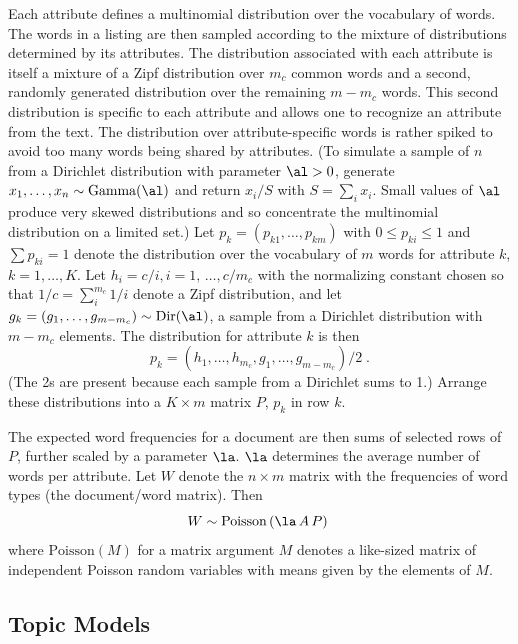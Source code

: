 \documentclass[10pt]{article}
\begin{document}
Each attribute defines a multinomial distribution over the vocabulary of words. The words in a listing are then sampled according to the mixture of  distributions determined by its attributes. The distribution associated with each attribute is itself a mixture of a Zipf distribution over $m_c$ common words and a second, randomly generated distribution over the remaining $m-m_c$ words.   This second distribution is specific to each attribute and allows one to recognize an attribute from the text.   The distribution over attribute-specific words is rather spiked to avoid too many words being shared by attributes.  (To simulate a sample of $n$ from a Dirichlet distribution with parameter $\al>0$, generate $x_1,\ldots,x_n \sim \mbox{Gamma}(\al)$ and return $x_i/S$ with $S = \sum_i x_i$.  Small values of $\al$ produce very skewed distributions and so concentrate the multinomial distribution on a limited set.)  Let $p_{k} = (p_{k1},\ldots,p_{km})$ with $0 \le p_{ki} \le 1$ and $\sum p_{ki} = 1$ denote the distribution over the vocabulary of $m$  words for attribute $k$, $k = 1,\ldots,K$.  Let $h_i = c/i, i = 1,\, \ldots, c/m_c$ with the normalizing constant chosen so that $1/c = \sum_i^{m_c} 1/i$ denote a Zipf distribution, and let $g_k = (g_1,\ldots,g_{m-m_c}) \sim \mbox{Dir}(\al)$, a sample from a Dirichlet distribution with $m-m_c$ elements.  The distribution for attribute $k$ is then
\begin{equation}
  p_k = ( h_1, \ldots, h_{m_c},  g_1,\ldots,g_{m-m_c})/2 \;.
\end{equation}
(The 2s are present because each sample from a Dirichlet sums to 1.)  Arrange these distributions into a $K \times m$ matrix $P$, $p_k$ in row $k$.  

The expected word frequencies for a document are then sums of selected rows of $P$, further scaled by a parameter $\la$.  $\la$ determines the average number of words per attribute.  Let $W$ denote the $n \times m$ matrix with the frequencies of word types (the document/word matrix).  Then
\begin{equation}
	W \sim \mbox{Poisson} \left(\la \, A \, P \right) \;
\end{equation}
where $\mbox{Poisson}(M)$ for a matrix argument $M$ denotes a like-sized matrix of independent Poisson random variables with means given by the elements of $M$.




\subsection {Topic Models}  %
\end{document}
